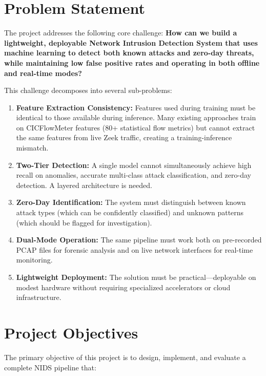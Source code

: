 \documentclass[12pt,a4paper,twoside]{report}
\begin{document}
\section{Problem Statement}

The project addresses the following core challenge: \textbf{How can we build a lightweight, deployable Network Intrusion Detection System that uses machine learning to detect both known attacks and zero-day threats, while maintaining low false positive rates and operating in both offline and real-time modes?}

This challenge decomposes into several sub-problems:

\begin{enumerate}[label=\textbf{P\arabic*:},leftmargin=*]
    \item \textbf{Feature Extraction Consistency:} Features used during training must be identical to those available during inference. Many existing approaches train on CICFlowMeter features (80+ statistical flow metrics) but cannot extract the same features from live Zeek traffic, creating a training-inference mismatch.
    \item \textbf{Two-Tier Detection:} A single model cannot simultaneously achieve high recall on anomalies, accurate multi-class attack classification, and zero-day detection. A layered architecture is needed.
    \item \textbf{Zero-Day Identification:} The system must distinguish between known attack types (which can be confidently classified) and unknown patterns (which should be flagged for investigation).
    \item \textbf{Dual-Mode Operation:} The same pipeline must work both on pre-recorded PCAP files for forensic analysis and on live network interfaces for real-time monitoring.
    \item \textbf{Lightweight Deployment:} The solution must be practical—deployable on modest hardware without requiring specialized accelerators or cloud infrastructure.
\end{enumerate}

\section{Project Objectives}

The primary objective of this project is to design, implement, and evaluate a complete NIDS pipeline that:
\end{document}
